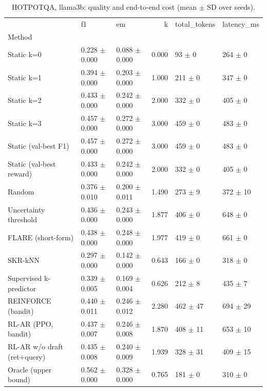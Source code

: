 \begin{table}
\caption{HOTPOTQA, llama3b: quality and end-to-end cost (mean $\pm$ SD over seeds).}
\begin{tabular}{lllrll}
\toprule
 & f1 & em & k & total_tokens & latency_ms \\
Method &  &  &  &  &  \\
\midrule
Static k=0 & 0.228 $\pm$ 0.000 & 0.088 $\pm$ 0.000 & 0.000 & 93 $\pm$ 0 & 264 $\pm$ 0 \\
Static k=1 & 0.394 $\pm$ 0.000 & 0.203 $\pm$ 0.000 & 1.000 & 211 $\pm$ 0 & 347 $\pm$ 0 \\
Static k=2 & 0.433 $\pm$ 0.000 & 0.242 $\pm$ 0.000 & 2.000 & 332 $\pm$ 0 & 405 $\pm$ 0 \\
Static k=3 & 0.457 $\pm$ 0.000 & 0.272 $\pm$ 0.000 & 3.000 & 459 $\pm$ 0 & 483 $\pm$ 0 \\
Static (val-best F1) & 0.457 $\pm$ 0.000 & 0.272 $\pm$ 0.000 & 3.000 & 459 $\pm$ 0 & 483 $\pm$ 0 \\
Static (val-best reward) & 0.433 $\pm$ 0.000 & 0.242 $\pm$ 0.000 & 2.000 & 332 $\pm$ 0 & 405 $\pm$ 0 \\
Random & 0.376 $\pm$ 0.010 & 0.200 $\pm$ 0.011 & 1.490 & 273 $\pm$ 9 & 372 $\pm$ 10 \\
Uncertainty threshold & 0.436 $\pm$ 0.000 & 0.243 $\pm$ 0.000 & 1.877 & 406 $\pm$ 0 & 648 $\pm$ 0 \\
FLARE (short-form) & 0.438 $\pm$ 0.000 & 0.248 $\pm$ 0.000 & 1.977 & 419 $\pm$ 0 & 661 $\pm$ 0 \\
SKR-kNN & 0.297 $\pm$ 0.000 & 0.142 $\pm$ 0.000 & 0.643 & 166 $\pm$ 0 & 318 $\pm$ 0 \\
Supervised k-predictor & 0.339 $\pm$ 0.005 & 0.169 $\pm$ 0.004 & 0.626 & 212 $\pm$ 8 & 435 $\pm$ 7 \\
REINFORCE (bandit) & 0.440 $\pm$ 0.011 & 0.246 $\pm$ 0.012 & 2.280 & 462 $\pm$ 47 & 694 $\pm$ 29 \\
RL-AR (PPO, bandit) & 0.437 $\pm$ 0.007 & 0.246 $\pm$ 0.008 & 1.870 & 408 $\pm$ 11 & 653 $\pm$ 10 \\
RL-AR w/o draft (ret+query) & 0.435 $\pm$ 0.008 & 0.240 $\pm$ 0.009 & 1.939 & 328 $\pm$ 31 & 409 $\pm$ 15 \\
Oracle (upper bound) & 0.562 $\pm$ 0.000 & 0.328 $\pm$ 0.000 & 0.765 & 181 $\pm$ 0 & 310 $\pm$ 0 \\
\bottomrule
\end{tabular}
\end{table}
